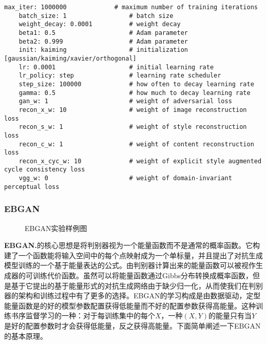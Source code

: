 \begin{lstlisting}[basicstyle=\small, caption={MUNIT主要优化参数配置}, captionpos=b]
    max_iter: 1000000             # maximum number of training iterations
    batch_size: 1                 # batch size
    weight_decay: 0.0001          # weight decay
    beta1: 0.5                    # Adam parameter
    beta2: 0.999                  # Adam parameter
    init: kaiming                 # initialization [gaussian/kaiming/xavier/orthogonal]
    lr: 0.0001                    # initial learning rate
    lr_policy: step               # learning rate scheduler
    step_size: 100000             # how often to decay learning rate
    gamma: 0.5                    # how much to decay learning rate
    gan_w: 1                      # weight of adversarial loss
    recon_x_w: 10                 # weight of image reconstruction loss
    recon_s_w: 1                  # weight of style reconstruction loss
    recon_c_w: 1                  # weight of content reconstruction loss
    recon_x_cyc_w: 10             # weight of explicit style augmented cycle consistency loss
    vgg_w: 0                      # weight of domain-invariant perceptual loss
\end{lstlisting}

\subsubsection[EBGAN]{EBGAN}

\begin{figure}[b]
    \centering
    \caption{EBGAN实验样例图}
    \label{fig:ebgan}
\end{figure}

\textbf{EBGAN.}\cite{ebgan}\quad 的核心思想是将判别器视为一个能量函数而不是通常的概率函数。它构建了一个函数能将输入空间中的每个点映射成为一个单标量，并且提出了对抗生成模型训练的一个基于能量表达的公式。由判别器计算出来的能量函数可以被视作生成器的可训练代价函数。虽然可以将能量函数通过Gibbs分布转换成概率函数，但是基于它提出的基于能量形式的对抗生成网络由于缺少归一化，从而使我们在判别器的架构和训练过程中有了更多的选择。EBGAN的学习构成是由数据驱动，定型能量函数是的好的模型参数配置获得低能量而不好的配置参数获得高能量。这种训练书序监督学习的一种：对于每训练集中的每个$X$，一种$(X,Y)$的能量只有当$Y$是好的配置参数时才会获得低能量，反之获得高能量。下面简单阐述一下EBGAN的基本原理。

